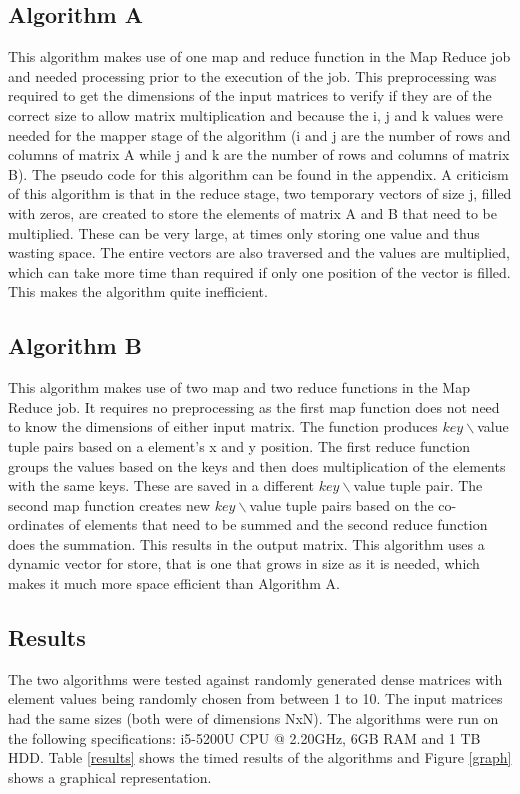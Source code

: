 \documentclass[10pt,onecolumn]{article}
\begin{document}
\subsection{Algorithm A}
This algorithm makes use of one map and reduce function in the Map Reduce job and needed processing prior to the execution of the job. This preprocessing was required to get the dimensions of the input matrices to verify if they are of the correct size to allow matrix multiplication and because the i, j and k values were needed for the mapper stage of the algorithm (i and j are the number of rows and columns of matrix A while j and k are the number of rows and columns of matrix B). The pseudo code for this algorithm can be found in the appendix. A criticism of this algorithm is that in the reduce stage, two temporary vectors of size j, filled with zeros, are created to store the elements of matrix A and B that need to be multiplied. These can be very large, at times only storing one value and thus wasting space. The entire vectors are also traversed and the values are multiplied, which can take more time than required if only one position of the vector is filled. This makes the algorithm quite inefficient.

\subsection{Algorithm B}
This algorithm makes use of two map and two reduce functions in the Map Reduce job. It requires no preprocessing as the first map function does not need to know the dimensions of either input matrix. The function produces $key\backslash$value tuple pairs based on a element's x and y position. The first reduce function groups the values based on the keys and then does multiplication of the elements with the same keys. These are saved in a different $key\backslash$value tuple pair. The second map function creates new $key\backslash$value tuple pairs based on the co-ordinates of elements that need to be summed and the second reduce function does the summation. This results in the output matrix. This algorithm uses a dynamic vector for store, that is one that grows in size as it is needed, which makes it much more space efficient than Algorithm A. 

\subsection{Results}
The two algorithms were tested against randomly generated dense matrices with element values being randomly chosen from between 1 to 10. The input matrices had the same sizes (both were of dimensions NxN). The algorithms were run on the following specifications: i5-5200U CPU @ 2.20GHz, 6GB RAM and 1 TB HDD. Table \ref{results} shows the timed results of the algorithms and Figure \ref{graph} shows a graphical representation. 
\end{document}
